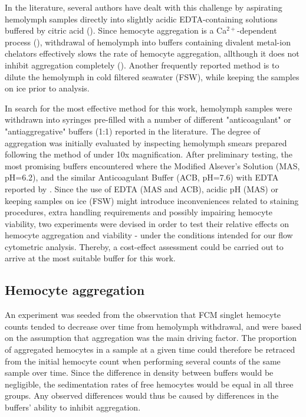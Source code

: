 In the literature, several authors have dealt with this challenge by aspirating hemolymph samples directly into slightly acidic EDTA-containing solutions buffered by citric acid (\cite{Söderhall1983, Bachere1988, LeFoll2010}). Since hemocyte aggregation is a Ca$^{2+}$-dependent process (\cite{Torreilles1999, Chen1995}), withdrawal of hemolymph into buffers containing divalent metal-ion chelators effectively slows the rate of hemocyte aggregation, allthough it does not inhibit aggregation completely (\cite{Chen1995}). Another frequently reported method is to dilute the hemolymph in cold filtered seawater (FSW), while keeping the samples on ice prior to analysis. 

In search for the most effective method for this work, hemolymph samples were withdrawn into syringes pre-filled with a number of different "anticoagulant" or "antiaggregative" buffers (1:1) reported in the literature. The degree of aggregation was initially evaluated by inspecting hemolymph smears prepared following the method of \cite{Bolognesi2012} under 10x magnification. After preliminary testing, the most promising buffers encountered where the Modified Alsever's Solution (MAS, pH=6.2), and the similar Anticoagulant Buffer (ACB, pH=7.6) with EDTA reported by \cite{Pipe1997}. Since the use of EDTA (MAS and ACB), acidic pH (MAS) or keeping samples on ice (FSW) might introduce inconveniences related to staining procedures, extra handling requirements and possibly impairing hemocyte viability, two experiments were devised in order to test their relative effects on hemocyte aggregation and viability - under the conditions intended for our flow cytometric analysis. Thereby, a cost-effect assessment could be carried out to arrive at the most suitable buffer for this work.

\subsection{Hemocyte aggregation}
An experiment was seeded from the observation that FCM singlet hemocyte counts tended to decrease over time from hemolymph withdrawal, and were based on the assumption that aggregation was the main driving factor. The proportion of aggregated hemocytes in a sample at a given time could therefore be retraced from the initial hemocyte count when performing several counts of the same sample over time. Since the difference in density between buffers would be negligible, the sedimentation rates of free hemocytes would be equal in all three groups. Any observed differences would thus be caused by differences in the buffers' ability to inhibit aggregation.

